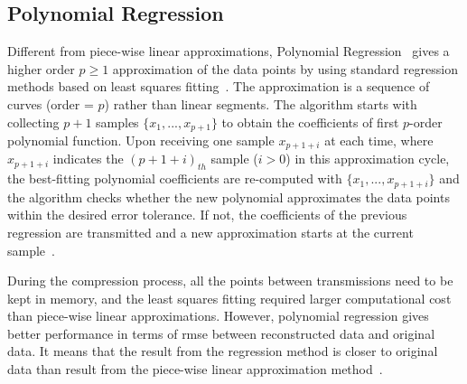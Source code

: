 \subsection{Polynomial Regression}
\label{sec:polynomial}

Different from piece-wise linear approximations, Polynomial
Regression~\cite{zordan2014performance} gives a higher order $p \geqslant1$
approximation of the data points by using standard regression methods based on least squares
fitting~\cite{phillips2003interpolation}. The approximation is a sequence of
curves (order = $p$) rather than linear segments. The algorithm starts with
collecting $p+1$ samples $\{x_1, ..., x_{p+1} \}$ to obtain the coefficients of
first $p$-order polynomial function. Upon receiving one sample $x_{p+1+i}$ at
each time, where $x_{p+1+i}$ indicates the $(p+1+i)_{th}$ sample ($i>0$) in this
approximation cycle, the best-fitting polynomial coefficients are re-computed
with $\{ x_1, ..., x_{p+1+i}\}$ and the algorithm checks whether the new
polynomial approximates the data points within the desired error tolerance. If
not, the coefficients of the previous regression are transmitted and a new
approximation starts at the current sample~\cite{zordan2014performance}.

During the compression process, all the points between transmissions need to be
kept in memory, and the least squares fitting required larger computational cost
than piece-wise linear approximations. However, polynomial regression gives
better performance in terms of \acrfull{rmse} between reconstructed data and
original data. It means that the result from the regression method is closer to
original data than result from the piece-wise linear approximation
method~\cite{zordan2014performance}.



